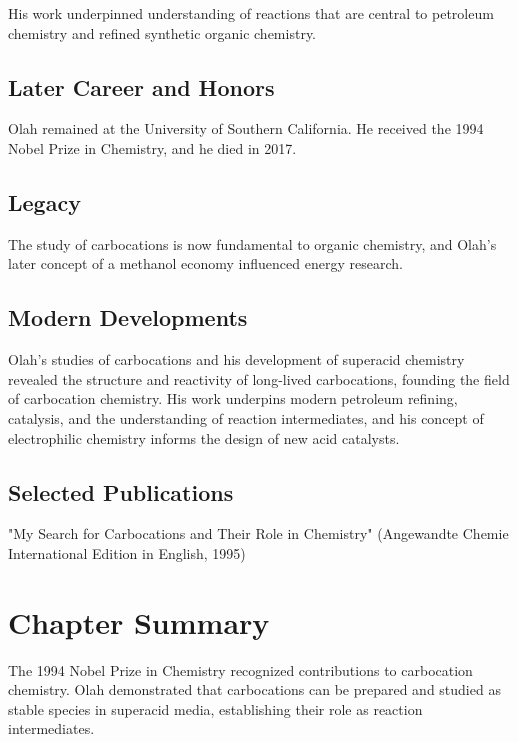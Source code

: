 His work underpinned understanding of reactions that are central to petroleum chemistry and refined synthetic organic chemistry.

\subsection*{Later Career and Honors}

Olah remained at the University of Southern California. He received the 1994 Nobel Prize in Chemistry, and he died in 2017.

\subsection*{Legacy}

The study of carbocations is now fundamental to organic chemistry, and Olah's later concept of a methanol economy influenced energy research.

\subsection*{Modern Developments}

Olah's studies of carbocations and his development of superacid chemistry revealed the structure and reactivity of long-lived carbocations, founding the field of carbocation chemistry. His work underpins modern petroleum refining, catalysis, and the understanding of reaction intermediates, and his concept of electrophilic chemistry informs the design of new acid catalysts.

\subsection*{Selected Publications}

"My Search for Carbocations and Their Role in Chemistry" (Angewandte Chemie International Edition in English, 1995)

\clearpage

\section*{Chapter Summary}

The 1994 Nobel Prize in Chemistry recognized contributions to carbocation chemistry. Olah demonstrated that carbocations can be prepared and studied as stable species in superacid media, establishing their role as reaction intermediates.
